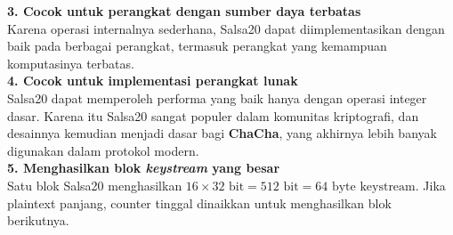 \documentclass{article}
\begin{document}

\textbf{3. Cocok untuk perangkat dengan sumber daya terbatas}\\ Karena operasi internalnya sederhana, Salsa20 dapat diimplementasikan dengan baik pada berbagai perangkat, termasuk perangkat yang kemampuan komputasinya terbatas.\\
\vspace{5mm}
\textbf{4. Cocok untuk implementasi perangkat lunak}\\ Salsa20 dapat memperoleh performa yang baik hanya dengan operasi integer dasar. Karena itu Salsa20 sangat populer dalam komunitas kriptografi, dan desainnya kemudian menjadi dasar bagi \textbf{ChaCha}, yang akhirnya lebih banyak digunakan dalam protokol modern.\\
\vspace{5mm}
\textbf{5. Menghasilkan blok \textit{keystream} yang besar}\\ Satu blok Salsa20 menghasilkan $16 \times 32 \text{ bit} = 512 \text{ bit} = 64 \text{ byte keystream}$. Jika plaintext panjang, counter tinggal dinaikkan untuk menghasilkan blok berikutnya.
\end{document}
